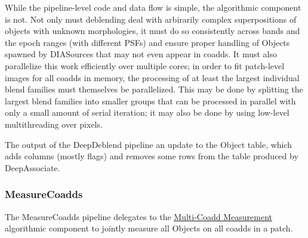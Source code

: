 While the pipeline-level code and data flow is simple, the algorithmic component is not.  Not only must deblending deal with arbirarily complex superpositions of objects with unknown morphologies, it must do so consistently across bands and the epoch ranges (with different PSFs) and ensure proper handling of Objects spawned by DIASources that may not even appear in coadds.  It must also parallelize this work efficiently over multiple cores; in order to fit patch-level images for all coadds in memory, the processing of at least the largest individual blend families must themselves be parallelized.  This may be done by splitting the largest blend families into smaller groups that can be processed in parallel with only a small amount of serial iteration; it may also be done by using low-level multithreading over pixels.

The output of the DeepDeblend pipeline an update to the Object table, which adds columns (mostly flags) and removes some rows from the table produced by DeepAssociate.

\subsubsection{MeasureCoadds}
\label{sec:drpMeasureCoadds}

The MeasureCoadds pipeline delegates to the \hyperref[sec:acMultiCoaddMeasurement]{Multi-Coadd Measurement} algorithmic component to jointly measure all Objects on all coadds in a patch.


